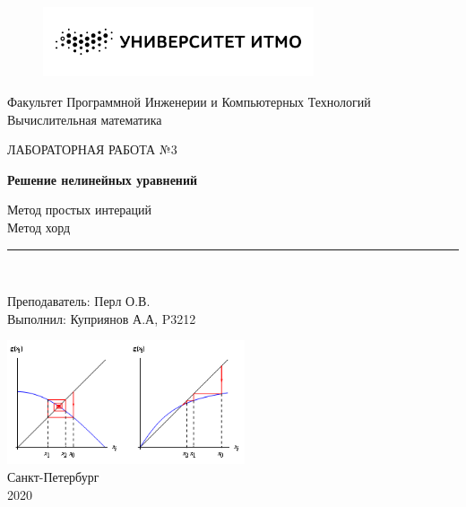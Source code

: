 \documentclass[11pt, english]{article}
\begin{document}
\begin{titlepage}

\begin{center}
\vspace*{-1in}
\begin{figure}[htb]
\begin{center}
\includegraphics[width=8cm]{bw_w_rus.png}
\end{center}
\end{figure}

Факультет Программной Инженерии и Компьютерных Технологий \\
\vspace*{0.15in}
Вычислительная математика \\
\vspace*{0.4in}
\begin{large}
ЛАБОРАТОРНАЯ РАБОТА №3\\
\end{large}
\vspace*{0.2in}
\begin{Large}
\textbf{Решение нелинейных уравнений} \\
\end{Large}
\vspace*{0.3in}
\begin{large}
Метод простых интераций \\
Метод хорд \\
\end{large}
\vspace*{0.3in}
\rule{80mm}{0.1mm}\\
\vspace*{0.1in}
\begin{large}
Преподаватель: Перл О.В. \\
Выполнил: Куприянов А.А, P3212 \\
\end{large}
\vspace*{1.5in}
\includegraphics[width=7cm]{fixed_point_iteration_im2.png}
\\
Санкт-Петербург \\
2020
\end{center}
\end{titlepage}
\end{document}
